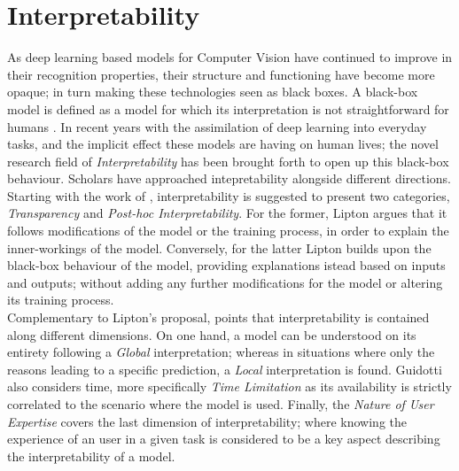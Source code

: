 \section{Interpretability}
\label{rel:sec_int}
As deep learning based models for Computer Vision have continued to improve in their recognition 
properties, their structure and functioning have become more opaque; in turn making these 
technologies seen as black boxes. A black-box model is defined as a model for which its 
interpretation is not straightforward for humans \autocite{petch2022opening}. In recent years 
with the assimilation of deep learning into everyday tasks, and the implicit effect these models 
are having on human lives; the novel research field of \emph{Interpretability} has been brought 
forth to open up this black-box behaviour. Scholars have approached intepretability alongside 
different directions. Starting with the work of \cite{li2018deep}, interpretability is suggested 
to present two categories, \emph{Transparency} and \emph{Post-hoc Interpretability}.
For the former, Lipton argues that it follows modifications of the model or the training process, 
in order to explain the inner-workings of the model. Conversely, for the latter Lipton builds upon 
the black-box behaviour of the model, providing explanations istead based on inputs and outputs; 
without adding any further modifications for the model or altering its training process.\\

Complementary to Lipton's proposal, \cite{guidotti2018survey} points that interpretability is 
contained along different dimensions. On one hand, a model can be understood on its entirety 
following a \emph{Global} interpretation; whereas in situations where only the reasons leading to a 
specific prediction, a \emph{Local} interpretation is found. Guidotti also considers time,
more specifically \emph{Time Limitation} as its availability is strictly correlated to the scenario 
where the model is used. Finally, the \emph{Nature of User Expertise} covers the last dimension of 
interpretability; where knowing the experience of an user in a given task is considered to be a 
key aspect describing the interpretability of a model.\\


